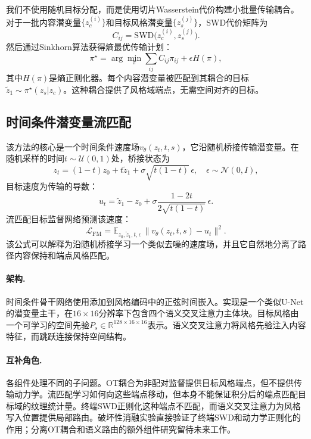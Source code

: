﻿\documentclass[letterpaper]{article}
\begin{document}
我们不使用随机目标分配，而是使用切片Wasserstein代价构建小批量传输耦合。对于一批内容潜变量$\{z_c^{(i)}\}$和目标风格潜变量$\{z_s^{(j)}\}$，SWD代价矩阵为
\begin{equation}
    C_{ij} = \mathrm{SWD}\bigl(z_c^{(i)}, z_s^{(j)}\bigr) .
\end{equation}
然后通过Sinkhorn算法获得熵最优传输计划：
\begin{equation}
    \pi^\star = \arg\min_\pi \sum_{ij} C_{ij}\pi_{ij} + \epsilon H(\pi),
\end{equation}
其中$H(\pi)$是熵正则化器。每个内容潜变量被匹配到其耦合的目标$\tilde{z}_1 \sim \pi^\star(z_s|z_c)$。这种耦合提供了风格域端点，无需空间对齐的目标。

\subsection{时间条件潜变量流匹配}
该方法的核心是一个时间条件速度场$v_\theta(z_t,t,s)$，它沿随机桥接传输潜变量。在随机采样的时间$t\sim\mathcal{U}(0,1)$处，桥接状态为
\begin{equation}
    z_t = (1-t)z_0 + t\tilde{z}_1 + \sigma\sqrt{t(1-t)}\,\epsilon,
    \quad \epsilon\sim\mathcal{N}(0,I),
\end{equation}
目标速度为传输的导数：
\begin{equation}
    u_t = \tilde{z}_1 - z_0 + \sigma\frac{1-2t}{2\sqrt{t(1-t)}}\,\epsilon .
\end{equation}
流匹配目标监督网络预测该速度：
\begin{equation}
    \mathcal{L}_{\mathrm{FM}} = \mathbb{E}_{z_0,\tilde{z}_1,t,\epsilon}\,
    \bigl\|v_\theta(z_t,t,s) - u_t\bigr\|^2 .
\end{equation}
该公式可以解释为沿随机桥接学习一个类似去噪的速度场，并且它自然地分离了路径内容保持和端点风格匹配。

\paragraph{架构.}
时间条件骨干网络使用添加到风格编码中的正弦时间嵌入。实现是一个类似U-Net的潜变量主干，在$16\times16$分辨率下包含四个语义交叉注意力主体块。目标风格由一个可学习的空间先验$P_s\in\mathbb{R}^{128\times16\times16}$表示。语义交叉注意力将风格先验注入内容特征，而跳跃连接保持空间结构。

\paragraph{互补角色.}
各组件处理不同的子问题。OT耦合为非配对监督提供目标风格端点，但不提供传输动力学。流匹配学习如何向这些端点移动，但本身不能保证积分后的端点匹配目标域的纹理统计量。终端SWD正则化这种端点不匹配，而语义交叉注意力为风格写入位置提供局部路由。破坏性消融实验直接验证了终端SWD和动力学正则化的作用；分离OT耦合和语义路由的额外组件研究留待未来工作。
\end{document}
